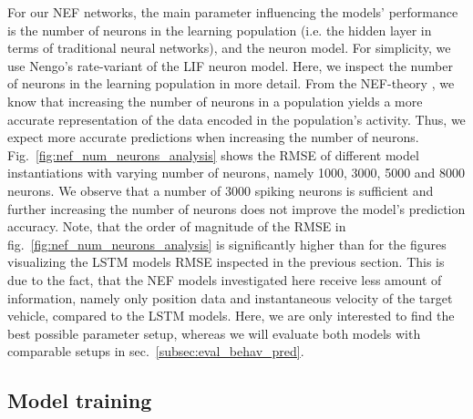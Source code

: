 For our \ac{NEF} networks, the main parameter influencing the models' performance is the number of neurons in the learning population (i.e. the hidden layer in terms of traditional neural networks), and the neuron model.
For simplicity, we use \acs{Nengo}'s rate-variant of the \ac{LIF} neuron model.
Here, we inspect the number of neurons in the learning population in more detail.
From the \ac{NEF}-theory \cite{Eliasmith2003}, we know that increasing the number of neurons in a population yields a more accurate representation of the data encoded in the population's activity.
Thus, we expect more accurate predictions when increasing the number of neurons.
Fig.~\ref{fig:nef_num_neurons_analysis} shows the \ac{RMSE} of different model instantiations with varying number of neurons, namely \num{1000}, \num{3000}, \num{5000} and \num{8000} neurons.
We observe that a number of \num{3000} spiking neurons is sufficient and further increasing the number of neurons does not improve the model's prediction accuracy.
Note, that the order of magnitude of the \ac{RMSE} in fig.~\ref{fig:nef_num_neurons_analysis} is significantly higher than for the figures visualizing the \ac{LSTM} models \ac{RMSE} inspected in the previous section. 
This is due to the fact, that the \ac{NEF} models investigated here receive less amount of information, namely only position data and instantaneous velocity of the target vehicle, compared to the \ac{LSTM} models.
Here, we are only interested to find the best possible parameter setup, whereas we will evaluate both models with comparable setups in sec.~\ref{subsec:eval_behav_pred}.

\subsection{Model training}
\label{subsec:model_train}
